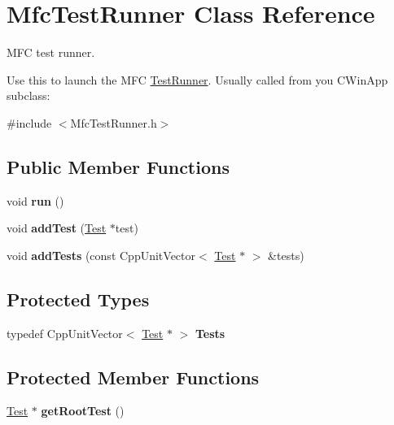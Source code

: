 \hypertarget{class_mfc_test_runner}{}\section{Mfc\+Test\+Runner Class Reference}
\label{class_mfc_test_runner}


M\+FC test runner.

Use this to launch the M\+FC \hyperlink{class_test_runner}{Test\+Runner}. Usually called from you C\+Win\+App subclass\+:  




{\ttfamily \#include $<$Mfc\+Test\+Runner.\+h$>$}

\subsection*{Public Member Functions}
\begin{DoxyCompactItemize}
\item 
void {\bfseries run} ()\hypertarget{class_mfc_test_runner_aea503f886c3a992b557d4dfc223bb0b2}{}\label{class_mfc_test_runner_aea503f886c3a992b557d4dfc223bb0b2}

\item 
void {\bfseries add\+Test} (\hyperlink{class_test}{Test} $\ast$test)\hypertarget{class_mfc_test_runner_aedb029517afb5863e483bf9ff0d7d1ed}{}\label{class_mfc_test_runner_aedb029517afb5863e483bf9ff0d7d1ed}

\item 
void {\bfseries add\+Tests} (const Cpp\+Unit\+Vector$<$ \hyperlink{class_test}{Test} $\ast$ $>$ \&tests)\hypertarget{class_mfc_test_runner_a99c469dd7f65c820a378e217ca886fd9}{}\label{class_mfc_test_runner_a99c469dd7f65c820a378e217ca886fd9}

\end{DoxyCompactItemize}
\subsection*{Protected Types}
\begin{DoxyCompactItemize}
\item 
typedef Cpp\+Unit\+Vector$<$ \hyperlink{class_test}{Test} $\ast$ $>$ {\bfseries Tests}\hypertarget{class_mfc_test_runner_a6911063cb903f782927897e33df1692f}{}\label{class_mfc_test_runner_a6911063cb903f782927897e33df1692f}

\end{DoxyCompactItemize}
\subsection*{Protected Member Functions}
\begin{DoxyCompactItemize}
\item 
\hyperlink{class_test}{Test} $\ast$ {\bfseries get\+Root\+Test} ()\hypertarget{class_mfc_test_runner_ad810643faf74943741660ca94b9811ee}{}\label{class_mfc_test_runner_ad810643faf74943741660ca94b9811ee}

\end{DoxyCompactItemize}
